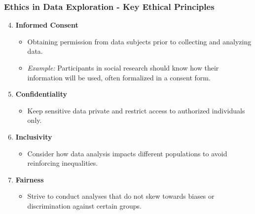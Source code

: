 \documentclass[aspectratio=169]{beamer}
\begin{document}
\begin{frame}[fragile]
    \frametitle{Ethics in Data Exploration - Key Ethical Principles}
    \begin{enumerate}
        \setcounter{enumi}{3} %
        \item \textbf{Informed Consent}
            \begin{itemize}
                \item Obtaining permission from data subjects prior to collecting and analyzing data.
                \item \textit{Example:} Participants in social research should know how their information will be used, often formalized in a consent form.
            \end{itemize}
        
        \item \textbf{Confidentiality}
            \begin{itemize}
                \item Keep sensitive data private and restrict access to authorized individuals only.
            \end{itemize}
        
        \item \textbf{Inclusivity}
            \begin{itemize}
                \item Consider how data analysis impacts different populations to avoid reinforcing inequalities.
            \end{itemize}

        \item \textbf{Fairness}
            \begin{itemize}
                \item Strive to conduct analyses that do not skew towards biases or discrimination against certain groups.
            \end{itemize}
    \end{enumerate}
\end{frame}
\end{document}
